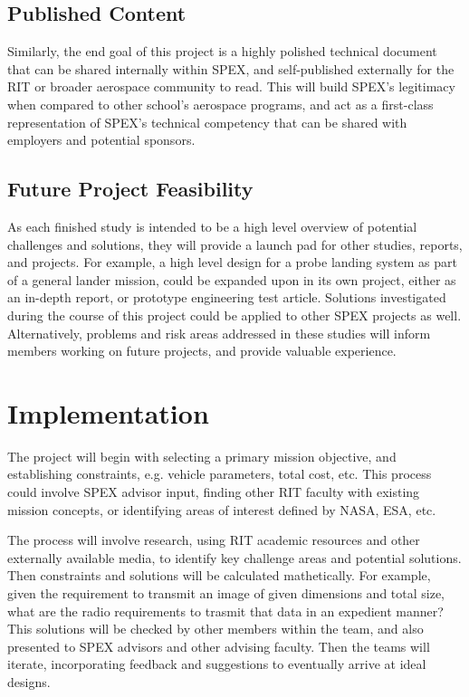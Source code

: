 \documentclass[conference]{IEEEtran} %
\begin{document}
\subsection{Published Content}
\label{subsec:traceability}
Similarly, the end goal of this project is a highly polished technical document that can be shared internally within SPEX, and self-published externally for the RIT or broader aerospace community to read.
This will build SPEX's legitimacy when compared to other school's aerospace programs, and act as a first-class representation of SPEX's technical competency that can be shared with employers and potential sponsors.

\subsection{Future Project Feasibility}
\label{subsec:plug-n-play}
As each finished study is intended to be a high level overview of potential challenges and solutions, they will provide a launch pad for other studies, reports, and projects.
For example, a high level design for a probe landing system as part of a general lander mission, could be expanded upon in its own project, either as an in-depth report, or prototype engineering test article.
Solutions investigated during the course of this project could be applied to other SPEX projects as well.
Alternatively, problems and risk areas addressed in these studies will inform members working on future projects, and provide valuable experience.
\section{Implementation}
\label{sec:implementation}
The project will begin with selecting a primary mission objective, and establishing constraints, e.g. vehicle parameters, total cost, etc.
This process could involve SPEX advisor input, finding other RIT faculty with existing mission concepts, or identifying areas of interest defined by NASA, ESA, etc.

The process will involve research, using RIT academic resources and other externally available media, to identify key challenge areas and potential solutions.
Then constraints and solutions will be calculated mathetically. For example, given the requirement to transmit an image of given dimensions and total size, what are the radio requirements to trasmit that data in an expedient manner?
This solutions will be checked by other members within the team, and also presented to SPEX advisors and other advising faculty.
Then the teams will iterate, incorporating feedback and suggestions to eventually arrive at ideal designs.
\end{document}
